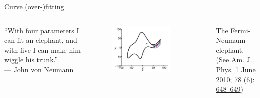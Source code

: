 \documentclass[10pt,aspectratio=169,handout]{beamer}
\begin{document}
\begin{frame}{Curve (over-)fitting }
	\begin{columns}
			``With four parameters I can fit an elephant, and with five I can make him wiggle his trunk.''\\
			\quad \quad --- John von Neumann
		\begin{figure}
			\centering
			\includegraphics[width=0.8\textwidth]{fig/elephant}
		\end{figure}%
	\begin{center}
	 The Fermi-Neumann elephant. \\ (See \href{https://doi.org/10.1119/1.3254017}{Am. J. Phys. 1 June 2010; 78 (6): 648–649})
	\end{center}

	\end{columns}
\end{frame}
\end{document}
